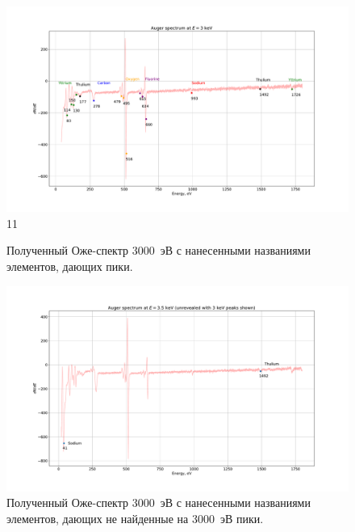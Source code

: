 \documentclass[a4paper, 12pt]{article}
\begin{document}
	\newpage
	
	\begin{figure}[H]
		\centering
		\includegraphics[width=1.3\linewidth, angle=-90]{1_Auge_3000}11
		\caption{Полученный Оже-спектр 3000~эВ с нанесенными названиями элементов, дающих пики.}
		\label{fig:1_Auge_3000}
	\end{figure}
	
	\newpage
	
	\begin{figure}[H]
		\centering
		\includegraphics[width=1.3\linewidth, angle=-90]{1_Auge_3500}
		\caption{Полученный Оже-спектр 3000~эВ с нанесенными названиями элементов, дающих не найденные на 3000~эВ пики.}
		\label{fig:1_Auge_3500}
	\end{figure}
	
	\newpage
	
\end{document}

